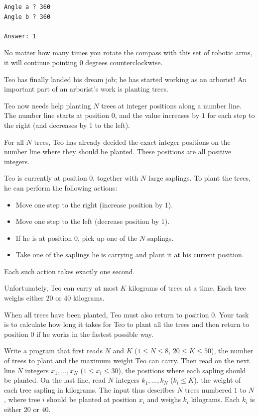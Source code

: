 \begin{verbatim}
Angle a ? 360
Angle b ? 360

Answer: 1
\end{verbatim}
 No matter how many times you rotate the compass with this set of robotic arms, it will continue pointing $0$ degrees counterclockwise.



\newpage
{}

Teo has finally landed his dream job; he has started working as an arborist!
An important part of an arborist's work is planting trees.

Teo now needs help planting $N$ trees at integer positions along a number line.
The number line starts at position $0$, and the value increases by $1$ for each step to the right (and decreases by $1$ to the left).

For all $N$ trees, Teo has already decided the exact integer positions on the number line where they should be planted.
These positions are all positive integers.

Teo is currently at position $0$, together with $N$ large saplings.
To plant the trees, he can perform the following actions:
\begin{itemize}
\item Move one step to the right (increase position by $1$).
\item Move one step to the left (decrease position by $1$).
\item If he is at position $0$, pick up one of the $N$ saplings.
\item Take one of the saplings he is carrying and plant it at his current position.
\end{itemize}
Each such action takes exactly one second.

Unfortunately, Teo can carry at most $K$ kilograms of trees at a time.
Each tree weighs either $20$ or $40$ kilograms.

When all trees have been planted, Teo must also return to position $0$.
Your task is to calculate how long it takes for Teo to plant all the trees and then return to position $0$ if he works in the fastest possible way.

Write a program that first reads $N$ and $K$ ($1 \leq N \leq 8$, $20 \leq K \leq 50$), the number of trees to plant and the maximum weight Teo can carry.
Then read on the next line $N$ integers $x_1, \dots, x_N$ ($1 \leq x_i \leq 30$), the positions where each sapling should be planted.
On the last line, read $N$ integers $k_1, \dots, k_N$ ($k_i \leq K$), the weight of each tree sapling in kilograms.
The input thus describes $N$ trees numbered $1$ to $N$, where tree $i$ should be planted at position $x_i$ and weighs $k_i$ kilograms.
Each $k_i$ is either $20$ or $40$.

